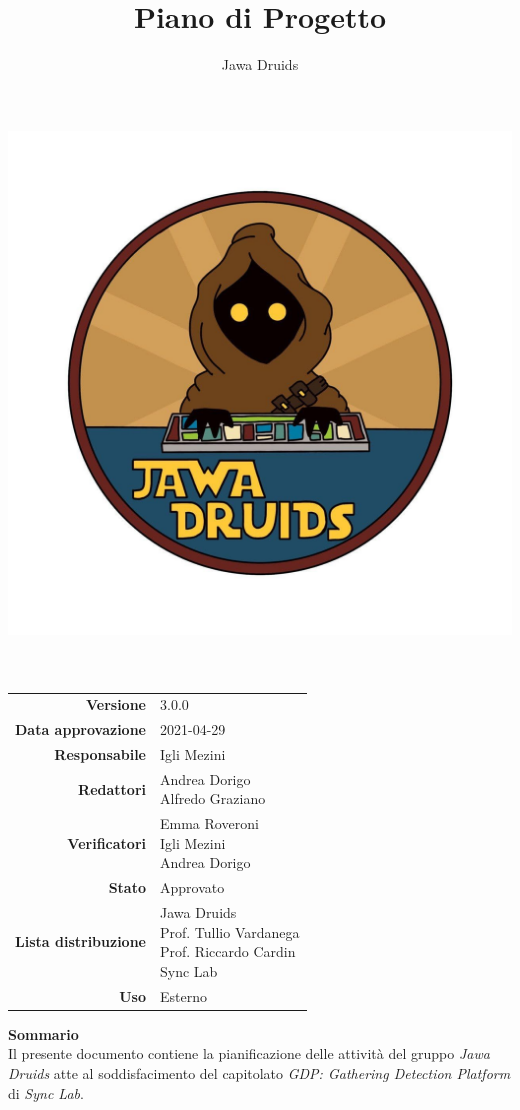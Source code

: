 




\makeatletter
\begin{titlepage}
	\begin{center}
		\vspace*{-5cm}
		\author{Jawa Druids}
		\title{Piano di Progetto}
		\date{} %
		\includegraphics[width=0.5\linewidth]{../immagini/DRUIDSLOGO.jpg}\\[4ex]
		{\huge \bfseries  \@title }\\[2ex]
		{\LARGE  \@author}\\[50ex]
		\vspace*{-9cm}
		\begin{table}[H]
			\renewcommand{\arraystretch}{1.4}
			\centering
			\begin{tabular}{r | l}
				\textbf{Versione} & 3.0.0 \\%
				\textbf{Data approvazione} & 2021-04-29\\
				\textbf{Responsabile} & Igli Mezini\\
				\textbf{Redattori} & \makecell[tl]{Andrea Dorigo  \\ Alfredo Graziano} \\
				\textbf{Verificatori} & \makecell[tl]{Emma Roveroni\\ Igli Mezini \\ Andrea Dorigo } \\
				\textbf{Stato} & Approvato\\
				\textbf{Lista distribuzione} & \makecell[tl]{Jawa Druids \\ Prof. Tullio Vardanega \\ Prof. Riccardo Cardin \\ Sync Lab}\\
				\textbf{Uso} & Esterno
			\end{tabular}
		\end{table}
		\vspace{0.1cm}
		\hfill \break
		\fontsize{17}{10}\textbf{Sommario} \\
		\vspace{0.1cm}
    Il presente documento contiene la pianificazione delle attività del gruppo  \normalsize\textit{Jawa Druids} atte al soddisfacimento del capitolato \normalsize\textit{GDP: Gathering Detection Platform} di  \normalsize\textit{Sync Lab}.
	\end{center}
\end{titlepage}
